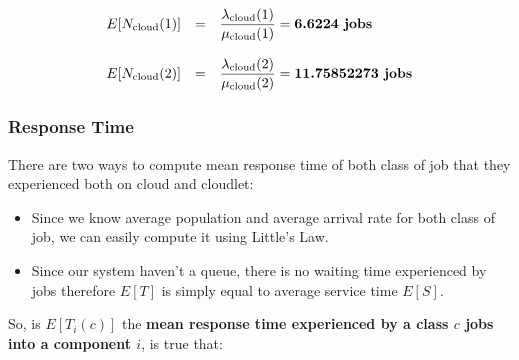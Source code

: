 \documentclass[10pt,a4paper]{article}
\begin{document}
\begin{equation}
\begin{array} {rcl} 
E[N_{\text{cloud}}(1)] & = & \dfrac{\lambda_{\text{cloud}}(1)}{\mu_{\text{cloud}}(1)} = \textbf{6.6224 \text{jobs}}  \\
\\
E[N_{\text{cloud}}(2)] & = & \dfrac{\lambda_{\text{cloud}}(2)}{\mu_{\text{cloud}}(2)} = \textbf{11.75852273 \text{jobs}} 
\\
\end{array}
\end{equation}

\subsubsection{Response Time}

There are two ways to compute mean response time of both class of job that they experienced both on cloud and cloudlet:
\begin{itemize}
\item Since we know average population and average arrival rate for both class of job, we can easily compute it using Little’s Law.
\item Since our system haven't a queue, there is no waiting time experienced by jobs therefore $E[T]$ is simply equal to average service time $E[S]$.
\end{itemize}

So, is $E[T_i(c)]$ the \textbf{mean response time experienced by a class $c$ jobs into a component $i$}, is true that:
\end{document}
